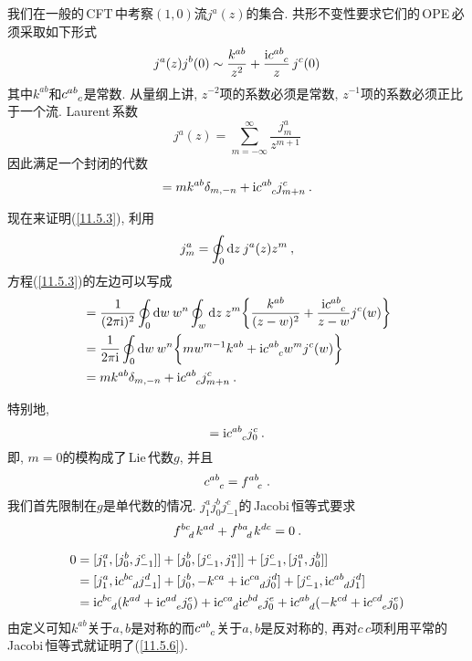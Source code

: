 我们在一般的\,CFT\,中考察$ (1,0) $流$ j^{a}(z) $的集合. 共形不变性要求它们的\,OPE\,必须采取如下形式
\begin{equation}
    j^{a}(z)j^{b}(0) \sim \frac{k^{ab}}{z^{2}} + \frac{\mi c\indices{^a^b_c}}{z}\,j^{c}(0) \label{11.5.1}
\end{equation}
其中$ k^{ab} $和$ c\indices{^a^b_c} $是常数. 从量纲上讲, $z^{-2} $项的系数必须是常数, $z^{-1} $项的系数必须正比于一个流. Laurent\,系数
\begin{equation}
    j^{a}(z) = \sum_{m=-\infty}^{\infty} \frac{j_{m}^{a}}{z^{m+1}} \label{11.5.2}
\end{equation}
因此满足一个封闭的代数
\begin{equation}
    [j_{m}^{a},j_{n}^{b}]=mk^{ab}\delta_{m,-n}+\mi c\indices{^a^b_c}j^{c}_{m+n} \:. \label{11.5.3}
\end{equation}
\begin{tcolorbox}
现在来证明(\ref{11.5.3}), 利用
\[
j_{m}^{a} = \oint_{0}\mathrm{d} z\: j^{a}(z)z^{m} \:,
\]
方程(\ref{11.5.3})的左边可以写成
\begin{align*}
     [j_{m}^{a},j_{n}^{b}] &= \frac{1}{(2\pi\mi)^{2}}\oint_{0} \dif w\: w^{n} \oint_{w}\dif z\: z^{m}
     \biggl\{\frac{k^{ab}}{(z-w)^{2}}+\frac{\mi c\indices{^a^b_c}}{z-w}j^{c}(w) \biggr\} \\
     &=\frac{1}{2\pi\mi} \oint_{0} \dif w\: w^{n} \biggl\{mw^{m-1}k^{ab}+ \mi c\indices{^a^b_c}w^{m}j^{c}(w) \biggr\}\\
     &=mk^{ab}\delta_{m,-n}+\mi c\indices{^a^b_c}j^{c}_{m+n} \:.
\end{align*}
\end{tcolorbox}
\noindent 特别地,
\begin{equation}
    [j^{a}_{0},j^{b}_{0}] = \mi c\indices{^a^b_c}j_{0}^{c} \:. \label{11.5.4}
\end{equation}
即, $m=0 $的模构成了\,Lie\,代数$ g$, 并且
\begin{equation}
    c\indices{^a^b_c}=f\indices{^a^b_c} \:. \label{11.5.5}
\end{equation}
我们首先限制在$ g $是单代数的情况. $j_{1}^{a}j_{0}^{b}j_{-1}^{c} $的\,Jacobi\,恒等式要求
\begin{equation}
    f\indices{^b^c_d}k^{ad}+f\indices{^b^a_d}k^{dc} = 0 \:. \label{11.5.6}
\end{equation}
\begin{tcolorbox}
\begin{align*}
    0 &= [j_{1}^{a},[j_{0}^{b},j_{-1}^{c}]]+[j_{0}^{b},[j_{-1}^{c},j_{1}^{a}]]
    +[j_{-1}^{c},[j_{1}^{a},j_{0}^{b}]] \\
    &= [j_{1}^{a},\mi c\indices{^b^c_d}j^{d}_{-1}]+ [j_{0}^{b},-k^{ca}+\mi c\indices{^c^a_d}j_{0}^{d}]
    +[j_{-1}^{c},\mi c\indices{^a^b_d}j_{1}^{d}]\\
    &=\mi c\indices{^b^c_d}(k^{ad}+\mi c\indices{^a^d_e}j^{e}_{0})+\mi c\indices{^c^a_d}\mi c\indices{^b^d_e}j^{e}_{0}
    +\mi c\indices{^a^b_d}(-k^{cd}+\mi c\indices{^c^d_e}j^{e}_{0})
\end{align*}
由定义可知$ k^{ab} $关于$ a,b $是对称的而$ c\indices{^a^b_c} $关于$ a,b $是反对称的, 再对$ c\,c $项利用平常的\,Jacobi\,恒等式就证明了(\ref{11.5.6}).
\end{tcolorbox}
